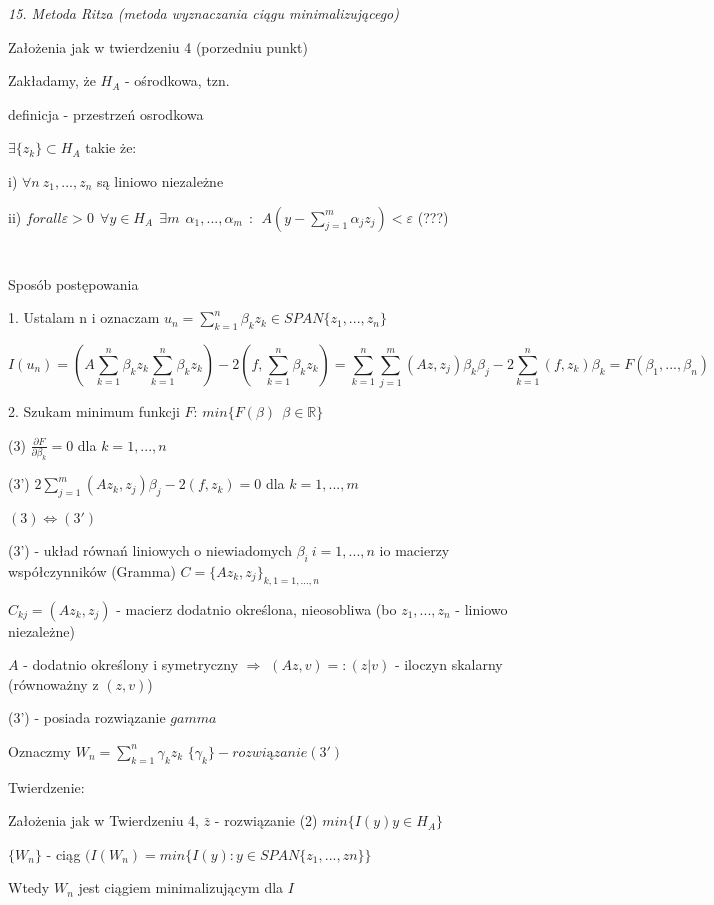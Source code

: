 \textit{15. Metoda Ritza (metoda wyznaczania ciągu minimalizującego)}

Założenia jak w twierdzeniu 4 (porzedniu punkt)

Zakładamy, że $H_A$ - ośrodkowa, tzn.

definicja - przestrzeń osrodkowa

$\exists \{z_k\} \subset H_A$ takie że:

i) $\forall n\ z_1, ..., z_n$ są liniowo niezależne

ii) $forall \varepsilon > 0\ \ \forall y \in H_A \ \ \exists m\ \ \alpha _1, ..., \alpha _m\ \ : \ \ A(y - \sum_{j=1}^{m} \alpha _j z_j) < \varepsilon$ (???)

$\ $

$\ $

Sposób postępowania

1. Ustalam n i oznaczam $u_n = \sum_{k=1}^{n} \beta _k z_k \in SPAN\{z_1, ..., z_n\}$

\[ I(u_n) = (A\sum_{k=1}^{n} \beta _k z_k \sum_{k=1}^{n} \beta _k z_k) - 2(f, \sum_{k=1}^{n} \beta _k z_k) = \sum_{k=1}^{n}\sum_{j=1}^{m} (Az,z_j) \beta _k \beta _j - 2\sum_{k=1}^{n} (f, z_k) \beta _k = F(\beta _1, ..., \beta _n)\]

2. Szukam minimum funkcji $F$: $min\{F(\beta)\ \ \beta \in \mathbb{R}\}$

(3) $\frac{\partial F}{\partial \beta _k} = 0$ dla $k = 1,...,n$

(3') $2 \sum_{j=1}^{m} (Az_k, z_j) \beta _j - 2(f, z_k) = 0$ dla $k = 1,...,m$

$ (3) \Leftrightarrow (3') $

(3') - układ równań liniowych o niewiadomych $\beta _i\ i = 1,...,n$ io macierzy współczynników (Gramma) $C = \{ Az_k, z_j \}_{k,1 = 1,...,n}$

$C_{kj} = (Az_k, z_j)$ - macierz dodatnio określona, nieosobliwa (bo $z_1,...,z_n$ - liniowo niezależne)

$A$ - dodatnio określony i symetryczny $\Rightarrow$ $(Az,v) =: (z|v)$ - iloczyn skalarny (równoważny z $(z,v)$)

(3') - posiada rozwiązanie $gamma$

Oznaczmy $W_n = \sum_{k=1}^{n} \gamma _k z_k$        $\{\gamma _k\} - rozwiązanie (3')$

Twierdzenie:

Założenia jak w Twierdzeniu 4, $\bar{z}$ - rozwiązanie (2) $ min\{ I(y) y \in H_A \}$

$\{W_n\}$ - ciąg $(I(W_n) = min\{I(y): y \in SPAN\{z_1,...,zn\}\}$

Wtedy ${W_n}$ jest ciągiem minimalizującym dla $I$


